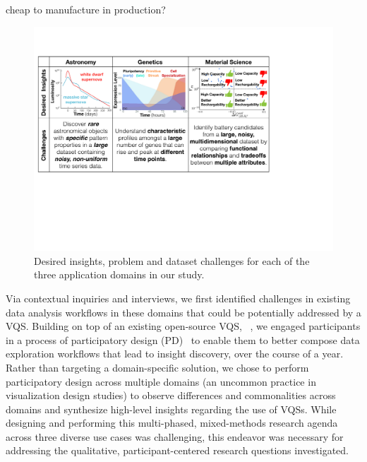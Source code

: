  cheap to manufacture in production?
 \begin{figure}[ht!]
 	\centering
 	\includegraphics[width=\linewidth]{figures/science_goal.pdf}
 	\caption{Desired insights, problem and dataset challenges for each of the three application domains in our study.}
 	\label{science_goal}
 	\vspace*{-15pt}
 \end{figure}
 \par Via contextual inquiries and interviews, we first identified challenges in existing data analysis workflows in these domains
 that could be potentially addressed by a VQS. Building on top of an existing open-source VQS, \zv~\cite{Siddiqui2017,Siddiqui2017VLDB}, we engaged participants in a process of participatory design (PD)~\cite{Muller1993,BodkerGronbaek,HoltzblattJones} to enable them to better compose data exploration workflows that lead to insight discovery, over the course of a year. Rather than targeting a domain-specific solution, we chose to perform participatory design across multiple domains (an uncommon practice in visualization design studies) to observe differences and commonalities across domains and synthesize high-level insights regarding the use of VQSs. While designing and performing this multi-phased, mixed-methods research agenda across three diverse use cases was challenging, this endeavor was necessary for addressing the qualitative, participant-centered research questions investigated.%
